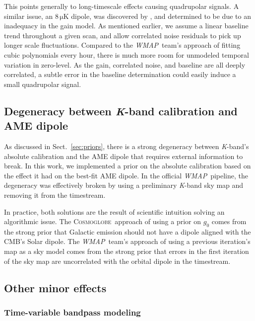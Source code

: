 \documentclass[twocolumn]{../../common/aa}
\def\WMAP{\emph{WMAP}}
\def\WMAPnine{\emph{WMAP9}}
\newcommand{\cosmoglobe}{\textsc{Cosmoglobe}}
\newcommand{\K}[0]{\textit K}
\begin{document}
This points generally to long-timescale effects causing quadrupolar signals. A similar issue, an $8\,\mathrm{\mu K}$ dipole,  was discovered by \citet{jarosik2007}, and determined to be due to an inadequacy in the gain model. As mentioned earlier, we assume a linear baseline trend throughout a given scan, and allow correlated noise residuals to pick up longer scale fluctuations. Compared to the \WMAP\ team's approach of fitting cubic polynomials every hour, there is much more room for unmodeled temporal variation in zero-level. As the gain, correlated noise, and baseline are all deeply correlated, a subtle error in the baseline determination could easily induce a small quadrupolar signal.



\subsection{Degeneracy between \K-band calibration and AME dipole}
\label{sec:ame_Kband}


As discussed in Sect.~\ref{sec:priors}, there is a strong degeneracy between \K-band's absolute calibration and the AME dipole that requires external information to break. In this work, we implemented a prior on the absolute calibration based on the effect it had on the best-fit AME dipole.
In the official \WMAP\ pipeline, the degeneracy was effectively broken by using a preliminary \K-band sky map and removing it from the timestream.

In practice, both solutions are the result of scientific intuition solving an algorithmic issue. The \cosmoglobe\ approach of using a prior on $g_0$ comes from the strong prior that Galactic emission should not have a dipole aligned with the CMB's Solar dipole. The \WMAP\ team's approach of using a previous iteration's map as a sky model comes from the strong prior that errors in the first iteration of the sky map are uncorrelated with the orbital dipole in the timestream.



\subsection{Other minor effects}
\label{sec:minor}

\subsubsection{Time-variable bandpass modeling}
\end{document}
